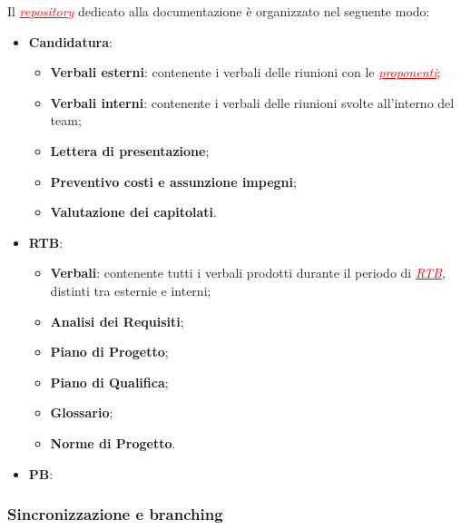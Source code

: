 Il \textcolor{red}{\uline{\textit{repository}}} dedicato alla documentazione è organizzato nel seguente modo:
\begin{itemize}
    \item \textbf{Candidatura}:
    \begin{itemize}
        \item \textbf{Verbali esterni}: contenente i verbali delle riunioni con le \textcolor{red}{\uline{\textit{proponenti}}};
        \item \textbf{Verbali interni}: contenente i verbali delle riunioni svolte all'interno del team;
        \item \textbf{Lettera di presentazione};
        \item \textbf{Preventivo costi e assunzione impegni};
        \item \textbf{Valutazione dei capitolati}.
    \end{itemize}
    \item \textbf{RTB}:
    \begin{itemize}
        \item \textbf{Verbali}: contenente tutti i verbali prodotti durante il periodo di \textcolor{red}{\uline{\textit{RTB}}}, distinti tra esternie e interni;
        \item \textbf{Analisi dei Requisiti};
        \item \textbf{Piano di Progetto};
        \item \textbf{Piano di Qualifica};
        \item \textbf{Glossario};
        \item \textbf{Norme di Progetto}.
    \end{itemize}
    \item \textbf{PB}:
\end{itemize}

\subsubsection{Sincronizzazione e branching}

